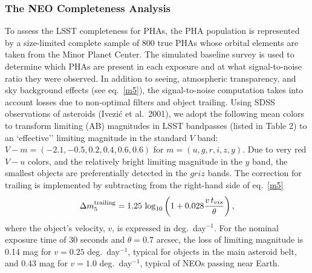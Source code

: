 \documentclass{emulateapj}
\begin{document}
\subsubsection{   The NEO Completeness Analysis    } 
\label{Sec:NEOc}
To assess the LSST completeness for PHAs, the PHA 
population is represented by a size-limited complete sample of 800 true
PHAs whose orbital elements are taken from the Minor Planet Center.
The simulated baseline survey is used to determine which PHAs are present in
each exposure and at what signal-to-noise ratio they were observed. In 
addition to  seeing, atmospheric transparency, and sky background effects
(see eq.~\ref{m5}), the signal-to-noise computation takes into account losses 
due to non-optimal filters and object trailing. Using SDSS observations
of asteroids (Ivezi\'c et al.~2001), we adopt the following mean colors to 
transform limiting (AB) magnitudes in LSST bandpasses (listed in Table 2)
to an `effective'' limiting magnitude in the standard $V$ band: 
$V-m=(-2.1, -0.5, 0.2, 0.4, 0.6, 0.6)$ for $m=(u,g,r,i,z,y)$. Due to 
very red $V-u$ colors, and the relatively bright limiting magnitude in the $y$ 
band, the smallest objects are preferentially detected in the $griz$ bands.
The correction for trailing is implemented by subtracting from the right-hand 
side of eq.~\ref{m5}
\begin{equation}
 \Delta m_5^{\rm trailing} = 1.25\,\log_{10}\left(1+0.028{v \,t_{vis} \over \theta}\right),
\end{equation}
where the object's velocity, $v$, is expressed in deg.~day$^{-1}$. For the nominal
exposure time of 30 seconds and $\theta=0.7$ arcsec, the loss of limiting 
magnitude is 0.14 mag for $v=0.25$ deg.~day$^{-1}$, typical for objects in the main 
asteroid belt, and 0.43 mag for $v=1.0$ deg.~day$^{-1}$, typical of NEOs passing
near Earth. 
\end{document}
